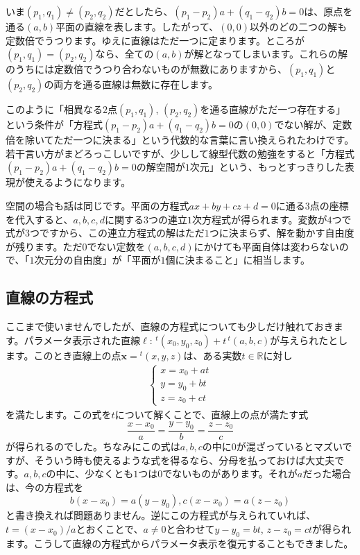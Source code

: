 いま$(p_1,q_1)\neq(p_2,q_2)$だとしたら、$(p_1-p_2 ) a + (q_1 - q_2) b = 0$は、原点を通る$(a,b)$平面の直線を表します。したがって、$(0,0)$以外のどの二つの解も定数倍でうつります。ゆえに直線はただ一つに定まります。ところが$(p_1,q_1)=(p_2,q_2)$なら、全ての$(a,b)$が解となってしまいます。これらの解のうちには定数倍でうつり合わないものが無数にありますから、$(p_1,q_1)$と$(p_2,q_2)$の両方を通る直線は無数に存在します。

このように「相異なる$2$点$(p_1,q_1)$, $(p_2,q_2)$を通る直線がただ一つ存在する」という条件が「方程式$(p_1 - p_2) a + (q_1 - q_2) b = 0$の$(0,0)$でない解が、定数倍を除いてただ一つに決まる」という代数的な言葉に言い換えられたわけです。若干言い方がまどろっこしいですが、少しして線型代数の勉強をすると「方程式$(p_1 - p_2) a + (q_1 - q_2) b = 0$の解空間が$1$次元」という、もっとすっきりした表現が使えるようになります。

空間の場合も話は同じです。平面の方程式$ax+by+cz+d = 0$に通る$3$点の座標を代入すると、$a,b,c,d$に関する$3$つの連立$1$次方程式が得られます。変数が$4$つで式が$3$つですから、この連立方程式の解はただ$1$つに決まらず、解を動かす自由度が残ります。ただ$0$でない定数を$(a,b,c,d)$にかけても平面自体は変わらないので、「$1$次元分の自由度」が「平面が$1$個に決まること」に相当します。

\subsection{直線の方程式}

ここまで使いませんでしたが、直線の方程式についても少しだけ触れておきます。パラメータ表示された直線$\ell\colon\,{}^t(x_0, y_0, z_0) + t\,{}^t(a, b, c)$が与えられたとします。このとき直線上の点$\bm{x}={}^t(x,y,z)$は、ある実数$t\in\mathbb{R}$に対し
\begin{align*}
\begin{cases}
x = x_0 + at \\
y = y_0 + bt \\
z = z_0 + ct
\end{cases}
\end{align*}
を満たします。この式を$t$について解くことで、直線上の点が満たす式
\[
\frac{x - x_0}{a} = \frac{y - y_0}{b} = \frac{z - z_0}{c}
\]
が得られるのでした。ちなみにこの式は$a,b,c$の中に$0$が混ざっているとマズいですが、そういう時も使えるような式を得るなら、分母を払っておけば大丈夫です。$a,b,c$の中に、少なくとも$1$つは$0$でないものがあります。それが$a$だった場合は、今の方程式を
\[
b(x - x_0) = a(y - y_0), c(x - x_0) = a(z - z_0)
\]
と書き換えれば問題ありません。逆にこの方程式が与えられていれば、$t = (x - x_0)/a$とおくことで、$a\neq 0$と合わせて$y - y_0=bt$, $z - z_0 = ct$が得られます。こうして直線の方程式からパラメータ表示を復元することもできました。

